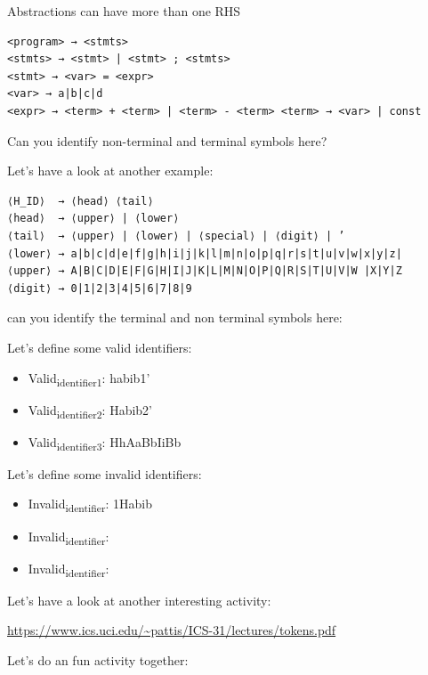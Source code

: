 \documentclass[11pt]{article}
\begin{document}
Abstractions can have more than one RHS

\begin{verbatim}
<program> → <stmts>
<stmts> → <stmt> | <stmt> ; <stmts>
<stmt> → <var> = <expr>
<var> → a|b|c|d
<expr> → <term> + <term> | <term> - <term> <term> → <var> | const
\end{verbatim}

Can you identify non-terminal and terminal symbols here?

Let's have a look at another example:

\begin{verbatim}
⟨H_ID⟩  → ⟨head⟩ ⟨tail⟩
⟨head⟩  → ⟨upper⟩ | ⟨lower⟩
⟨tail⟩  → ⟨upper⟩ | ⟨lower⟩ | ⟨special⟩ | ⟨digit⟩ | ’
⟨lower⟩ → a|b|c|d|e|f|g|h|i|j|k|l|m|n|o|p|q|r|s|t|u|v|w|x|y|z|
⟨upper⟩ → A|B|C|D|E|F|G|H|I|J|K|L|M|N|O|P|Q|R|S|T|U|V|W |X|Y|Z
⟨digit⟩ → 0|1|2|3|4|5|6|7|8|9
\end{verbatim}

can you identify the terminal and non terminal symbols here:

Let's define some valid identifiers:

\begin{itemize}
\item Valid\textsubscript{identifier1}: habib1'
\item Valid\textsubscript{identifier2}: Habib2'
\item Valid\textsubscript{identifier3}: HhAaBbIiBb
\end{itemize}

Let's define some invalid identifiers:

\begin{itemize}
\item Invalid\textsubscript{identifier}: 1Habib
\item Invalid\textsubscript{identifier}:
\item Invalid\textsubscript{identifier}:
\end{itemize}

Let's have a look at another interesting activity:


\url{https://www.ics.uci.edu/\~pattis/ICS-31/lectures/tokens.pdf}


Let's do an fun activity together:
\end{document}
